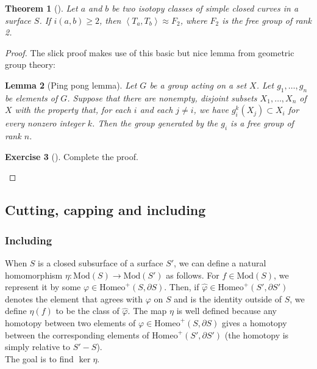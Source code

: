 \documentclass[reqno]{amsart}
\newtheorem{theorem}{Theorem}[section]
\newtheorem{lemma}[theorem]{Lemma}
\theoremstyle{definition}
\newtheorem{exercise}[theorem]{Exercise}
\theoremstyle{remark}
\newcommand{\Mod}{{\mathrm{Mod}}}
\newcommand{\Homeo}{{\mathrm{Homeo}}}
\begin{document}
\begin{theorem}[]
    Let $a$ and $b$ be two isotopy classes of simple closed
    curves in a surface $S$. If $i(a,b) \ge 2$, then
    $\left<T_a ,T_b \right> \approx F_2$, where
    $F_2$ is the free group of rank 2.
\end{theorem}

\begin{proof}
   The slick proof makes use of this basic but nice
   lemma from geometric group theory:

\begin{lemma}[Ping pong lemma]
    Let $G$ be a group acting on a set $X$. Let
    $g_1, \ldots, g_n$ be elements of $G$. Suppose
    that there are nonempty, disjoint subsets $X_1, \ldots,
    X_n$ of $X$ with the property that, for each
    $i$ and each $j\neq i$, we have
    $g_i^{k} \left( X_j  \right) \subset X_i$ for every
    nonzero integer $k$. Then the group generated
    by the $g_i$ is a free group of rank $n$.
\end{lemma}

\begin{exercise}[]
    Complete the proof.
\end{exercise}


\end{proof}


\subsection{Cutting, capping and including}

\subsubsection{Including}

When $S$ is a closed subsurface of a surface $S'$, we
can define a natural homomorphism $\eta \colon
\Mod(S) \to \Mod(S')$ as follows. For
$f \in \Mod(S)$, we represent it by some
$\varphi \in \Homeo^{+} \left( S, \partial S \right) $. Then,
if $\hat{\varphi} \in \Homeo^{+} \left( S', \partial S' \right) $ 
denotes the element that agrees with $\varphi $ on $S$ and
is the identity outside of $S$, we define
$\eta (f)$ to be the class of $\hat{\varphi }$. The map
$\eta $ is well defined because any homotopy
between two elements of $\varphi \in \Homeo^{+} (S, \partial
S)$ gives a homotopy between the corresponding elements
of $\Homeo^{+}\left( S', \partial S' \right) $ (the homotopy
is simply relative to $S' - S$).\\
\linebreak
The goal is to find $\ker \eta$.
\end{document}
